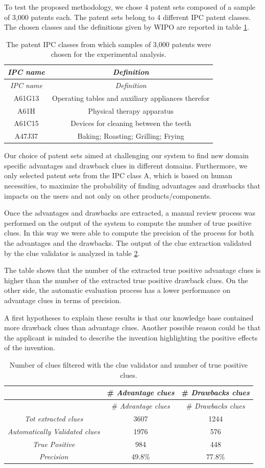 \documentclass[b5paper,]{book}
\theoremstyle{definition}
\theoremstyle{definition}
\theoremstyle{definition}
\theoremstyle{remark}
\begin{document}
To test the proposed methodology, we chose 4 patent sets composed of a
sample of 3,000 patents each. The patent sets belong to 4 different IPC
patent classes. The chosen classes and the definitions given by WIPO are
reported in table \ref{tab:advdrwarticleexampleipcclasses}.

\begin{longtable}[]{@{}cc@{}}
\caption{\label{tab:advdrwarticleexampleipcclasses} The patent IPC classes
from which samples of 3,000 patents were chosen for the experimental
analysis.}\tabularnewline
\toprule
\emph{IPC name} & \emph{Definition}\tabularnewline
\midrule
\endfirsthead
\toprule
\emph{IPC name} & \emph{Definition}\tabularnewline
\midrule
\endhead
A61G13 & Operating tables and auxiliary appliances
therefor\tabularnewline
A61H & Physical therapy apparatus\tabularnewline
A61C15 & Devices for cleaning between the teeth\tabularnewline
A47J37 & Baking; Roasting; Grilling; Frying\tabularnewline
\bottomrule
\end{longtable}

Our choice of patent sets aimed at challenging our system to find new
domain specific advantages and drawback clues in different domains.
Furthermore, we only selected patent sets from the IPC class A, which is
based on human necessities, to maximize the probability of finding
advantages and drawbacks that impacts on the users and not only on other
products/components.

Once the advantages and drawbacks are extracted, a manual review process
was performed on the output of the system to compute the number of true
positive clues. In this way we were able to compute the precision of the
process for both the advantages and the drawbacks. The output of the
clue extraction validated by the clue validator is analyzed in table
\ref{tab:advdrwarticlecluemeas}.

The table shows that the number of the extracted true positive advantage
clues is higher than the number of the extracted true positive drawback
clues. On the other side, the automatic evaluation process has a lower
performance on advantage clues in terms of precision.

A first hypotheses to explain these results is that our knowledge base
contained more drawback clues than advantage clues. Another possible
reason could be that the applicant is minded to describe the invention
highlighting the positive effects of the invention.

\begin{longtable}[]{@{}ccc@{}}
\caption{\label{tab:advdrwarticlecluemeas} Number of clues filtered with the
clue validator and number of true positive clues.}\tabularnewline
\toprule
& \# \emph{Advantage clues} & \# \emph{Drawbacks clues}\tabularnewline
\midrule
\endfirsthead
\toprule
& \# \emph{Advantage clues} & \# \emph{Drawbacks clues}\tabularnewline
\midrule
\endhead
\emph{Tot extracted clues} & 3607 & 1244\tabularnewline
\emph{Automatically Validated clues} & 1976 & 576\tabularnewline
\emph{True Positive} & 984 & 448\tabularnewline
\emph{Precision} & 49.8\% & 77.8\%\tabularnewline
\bottomrule
\end{longtable}
\end{document}

